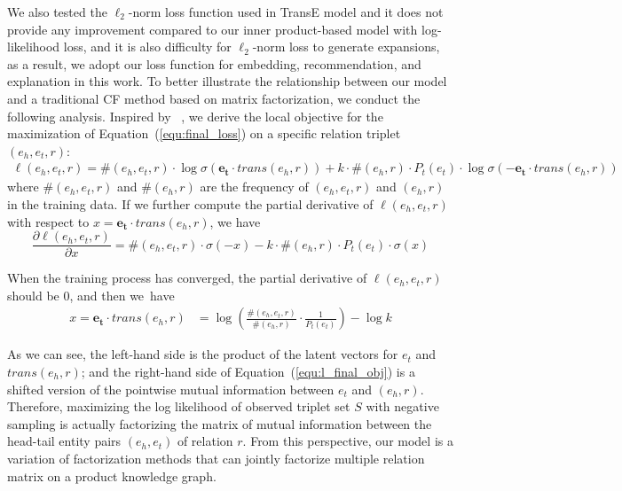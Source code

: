 \documentclass[algorithms,article,accept,moreauthors,pdftex,10pt,a4paper]{Definitions/mdpi}
\begin{document}
We also tested the $\ell_2$-norm loss function used in TransE model and it does not provide any improvement compared to our inner product-based model with log-likelihood loss, and it is also difficulty for $\ell_2$-norm loss to generate expansions, as a result, we adopt our loss function for embedding, recommendation, and explanation in this work. To better illustrate the relationship between our model and a traditional CF method based on matrix factorization, we conduct the following analysis. 
Inspired by ~\cite{levy2014neural}, we derive the local objective for the maximization of Equation~(\ref{equ:final_loss}) on a specific relation triplet $(e_h, e_t, r)$:
\begin{equation}
\begin{split}
\ell(e_h, e_t, r) = \#(e_h, e_t, r)\cdot\log\sigma(\bm{e_t} \cdot trans(e_h, r)) + k \cdot \#(e_h,r) \cdot P_t(e_t)\cdot \log\sigma(-\bm{e_t} \cdot trans(e_h, r))
\end{split}
\label{equ:local_object}
\end{equation} 
where $\#(e_h, e_t, r)$ and $\#(e_h,r)$ are the frequency of $(e_h, e_t, r)$ and $(e_h,r)$ in the training data.
If we further compute the partial derivative of $\ell(e_h, e_t, r)$ with respect to $x = \bm{e_t} \cdot trans(e_h, r)$, we have
\begin{equation}
\frac{\partial \ell(e_h, e_t, r)}{\partial x} = \#(e_h, e_t, r)\cdot \sigma(-x) - k\cdot \#(e_h,r)\cdot P_t(e_t)\cdot \sigma(x)
\label{equ:derivative}
\end{equation}

When the training process has converged, the partial derivative of $\ell(e_h, e_t, r)$ should be 0, and then we~have
\begin{equation}
\begin{split}
x = \bm{e_t} \cdot trans(e_h, r) & = \log(\frac{\#(e_h, e_t, r)}{\#(e_h,r)}\cdot \frac{1}{P_t(e_t)}) - \log k \end{split}
\label{equ:l_final_obj}
\end{equation}

As we can see, the left-hand side  is the product of the latent vectors for $e_t$ and $trans(e_h,r)$; and the right-hand side of Equation~(\ref{equ:l_final_obj}) is a shifted version of the pointwise mutual information between $e_t$ and $(e_h, r)$.
Therefore, maximizing the log likelihood of observed triplet set $S$ with negative sampling is actually factorizing the matrix of mutual information between the head-tail entity pairs $(e_h, e_t)$ of relation $r$.
From this perspective, our model is a variation of factorization methods that can jointly factorize multiple relation matrix on a product knowledge graph.
\end{document}
